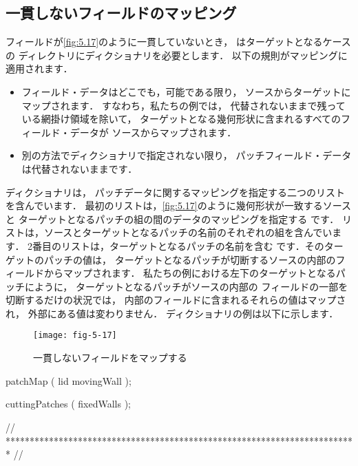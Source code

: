 \subsection{一貫しないフィールドのマッピング}
\label{ssec:5.6.2}
フィールドが\autoref{fig:5.17}のように一貫していないとき，
はターゲットとなるケースの
ディレクトリにディクショナリを必要とします．
以下の規則がマッピングに適用されます．
\begin{itemize}
 \item フィールド・データはどこでも，可能である限り，
       ソースからターゲットにマップされます．
       すなわち，私たちの例では，
       代替されないままで残っている網掛け領域を除いて，
       ターゲットとなる幾何形状に含まれるすべてのフィールド・データが
       ソースからマップされます．
 \item 別の方法でディクショナリで指定されない限り，
       パッチフィールド・データは代替されないままです．
\end{itemize}
ディクショナリは，
パッチデータに関するマッピングを指定する二つのリストを含んでいます．
最初のリストは，\autoref{fig:5.17}のように幾何形状が一致するソースと
ターゲットとなるパッチの組の間のデータのマッピングを指定する
%
%
です．
リストは，ソースとターゲットとなるパッチの名前のそれぞれの組を含んでいます．
2番目のリストは，ターゲットとなるパッチの名前を含む
です．そのターゲットのパッチの値は，
ターゲットとなるパッチが切断するソースの内部のフィールドからマップされます．
私たちの例における左下のターゲットとなるパッチにように，
ターゲットとなるパッチがソースの内部の
フィールドの一部を切断するだけの状況では，
内部のフィールドに含まれるそれらの値はマップされ，
外部にある値は変わりません．
ディクショナリの例は以下に示します．


\begin{figure}[ht]
 \texttt{[image: fig-5-17]}
 \caption{一貫しないフィールドをマップする}
 \label{fig:5.17}
\end{figure}

\begin{OFverbatim}[file, linenum=17]

patchMap        ( lid movingWall );

cuttingPatches  ( fixedWalls );


// ************************************************************************* //
\end{OFverbatim}

